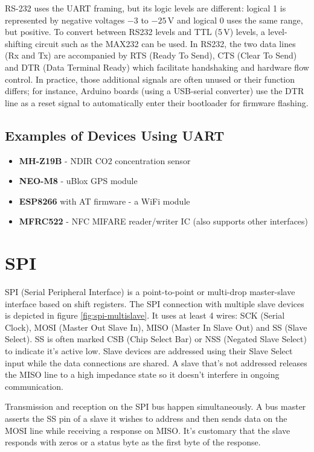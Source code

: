 RS-232 uses the UART framing, but its logic levels are different: logical 1 is represented by negative voltages $-3$ to $-25$\,V and logical 0 uses the same range, but positive. To convert between RS232 levels and TTL (5\,V) levels, a level-shifting circuit such as the MAX232 can be used. In RS232, the two data lines (Rx and Tx) are accompanied by RTS (Ready To Send), CTS (Clear To Send) and DTR (Data Terminal Ready) which facilitate handshaking and hardware flow control. In practice, those additional signals are often unused or their function differs; for instance, Arduino boards (using a USB-serial converter) use the DTR line as a reset signal to automatically enter their bootloader for firmware flashing.

\subsection{Examples of Devices Using UART}

\begin{itemize}
	\item \textbf{MH-Z19B} - NDIR CO2 concentration sensor 
	\item \textbf{NEO-M8} - uBlox GPS module
	\item \textbf{ESP8266} with AT firmware - a WiFi module
	\item \textbf{MFRC522} - NFC MIFARE reader/writer IC (also supports other interfaces)
\end{itemize}

\section{SPI}

SPI (Serial Peripheral Interface) is a point-to-point or multi-drop master-slave interface based on shift registers. The SPI connection with multiple slave devices is depicted in figure \ref{fig:spi-multislave}. It uses at least 4 wires: SCK (Serial Clock), MOSI (Master Out Slave In), MISO (Master In Slave Out) and SS (Slave Select). SS is often marked CSB (Chip Select Bar) or NSS (Negated Slave Select) to indicate it's active low. Slave devices are addressed using their Slave Select input while the data connections are shared. A slave that's not addressed releases the MISO line to a high impedance state so it doesn't interfere in ongoing communication.

Transmission and reception on the SPI bus happen simultaneously. A bus master asserts the SS pin of a slave it wishes to address and then sends data on the MOSI line while receiving a response on MISO. It's customary that the slave responds with zeros or a status byte as the first byte of the response.

